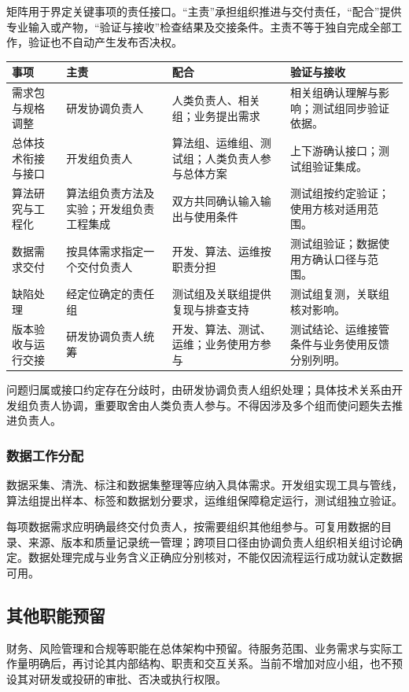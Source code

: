 \documentclass[11pt,a4paper]{article}
\begin{document}
矩阵用于界定关键事项的责任接口。“主责”承担组织推进与交付责任，“配合”提供专业输入或产物，“验证与接收”检查结果及交接条件。主责不等于独自完成全部工作，验证也不自动产生发布否决权。

\begin{longtable}{L{23mm}L{32mm}L{48mm}L{48mm}}
\toprule
事项 & 主责 & 配合 & 验证与接收\\\midrule\endhead
需求包与规格调整 & 研发协调负责人 & 人类负责人、相关组；业务提出需求 & 相关组确认理解与影响；测试组同步验证依据。\\
总体技术衔接与接口 & 开发组负责人 & 算法组、运维组、测试组；人类负责人参与总体方案 & 上下游确认接口；测试组验证集成。\\
算法研究与工程化 & 算法组负责方法及实验；开发组负责工程集成 & 双方共同确认输入输出与使用条件 & 测试组按约定验证；使用方核对适用范围。\\
数据需求交付 & 按具体需求指定一个交付负责人 & 开发、算法、运维按职责分担 & 测试组验证；数据使用方确认口径与范围。\\
缺陷处理 & 经定位确定的责任组 & 测试组及关联组提供复现与排查支持 & 测试组复测，关联组核对影响。\\
版本验收与运行交接 & 研发协调负责人统筹 & 开发、算法、测试、运维；业务使用方参与 & 测试结论、运维接管条件与业务使用反馈分别列明。\\\bottomrule
\end{longtable}

问题归属或接口约定存在分歧时，由研发协调负责人组织处理；具体技术关系由开发组负责人协调，重要取舍由人类负责人参与。不得因涉及多个组而使问题失去推进负责人。


\subsubsection{数据工作分配}

数据采集、清洗、标注和数据集整理等应纳入具体需求。开发组实现工具与管线，算法组提出样本、标签和数据划分要求，运维组保障稳定运行，测试组独立验证。

每项数据需求应明确最终交付负责人，按需要组织其他组参与。可复用数据的目录、来源、版本和质量记录统一管理；跨项目口径由协调负责人组织相关组讨论确定。数据处理完成与业务含义正确应分别核对，不能仅因流程运行成功就认定数据可用。


\subsection{其他职能预留}
财务、风险管理和合规等职能在总体架构中预留。待服务范围、业务需求与实际工作量明确后，再讨论其内部结构、职责和交互关系。当前不增加对应小组，也不预设其对研发或投研的审批、否决或执行权限。
\end{document}
